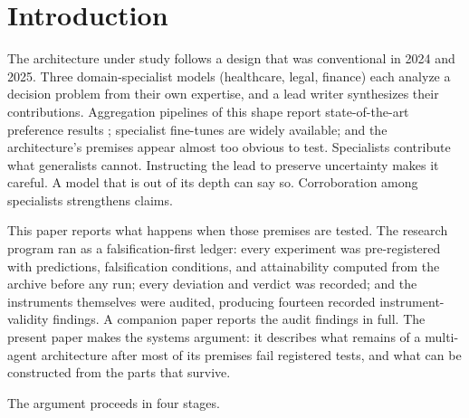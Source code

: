 \documentclass[11pt]{article}
\begin{document}
\section{Introduction}
\label{sec:intro}

The architecture under study follows a design that was conventional
in 2024 and 2025. Three domain-specialist models (healthcare, legal,
finance) each analyze a decision problem from their own expertise, and
a lead writer synthesizes their contributions. Aggregation pipelines of
this shape report state-of-the-art preference results
\cite{wang2024moa}; specialist fine-tunes are widely available; and the
architecture's premises appear almost too obvious to test. Specialists
contribute what generalists cannot. Instructing the lead to preserve
uncertainty makes it careful. A model that is out of its depth can say
so. Corroboration among specialists strengthens claims.

This paper reports what happens when those premises are tested. The
research program ran as a falsification-first ledger: every experiment
was pre-registered with predictions, falsification conditions, and
attainability computed from the archive before any run; every deviation
and verdict was recorded; and the instruments themselves were audited,
producing fourteen recorded instrument-validity findings. A companion
paper \cite{bobo2026audit} reports the audit findings in full. The
present paper makes the systems argument: it describes what remains of
a multi-agent architecture after most of its premises fail registered
tests, and what can be constructed from the parts that survive.

The argument proceeds in four stages.
\end{document}
